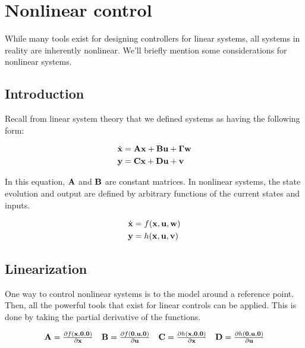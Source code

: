 
\chapter{Nonlinear control} \label{ch:nonlinear-control}

While many tools exist for designing controllers for linear systems, all systems
in reality are inherently nonlinear. We'll briefly mention some considerations
for nonlinear systems.

\section{Introduction}

Recall from linear system theory that we defined systems as having the following
form:

\begin{align*}
  \dot{\mathbf{x}} &= \mathbf{A}\mathbf{x} + \mathbf{B}\mathbf{u} + \mathbf{\Gamma}\mathbf{w} \\
  \mathbf{y} &= \mathbf{C}\mathbf{x} + \mathbf{D}\mathbf{u} + \mathbf{v}
\end{align*}

In this equation, $\mathbf{A}$ and $\mathbf{B}$ are constant matrices. In nonlinear
systems, the state evolution and output are defined by arbitrary functions of
the current states and inputs.

\begin{align*}
  \dot{\mathbf{x}} &= f(\mathbf{x}, \mathbf{u}, \mathbf{w}) \\
  \mathbf{y} &= h(\mathbf{x}, \mathbf{u}, \mathbf{v})
\end{align*}

\section{Linearization}

One way to control nonlinear systems is to 
the model around a reference point. Then, all the powerful tools that exist for
linear controls can be applied. This is done by taking the partial derivative of
the functions.

\begin{align*}
  \begin{array}{cccc}
    \mathbf{A} = \frac{\partial f(\mathbf{x}, \mathbf{0}, \mathbf{0})}{\partial \mathbf{x}} &
    \mathbf{B} = \frac{\partial f(\mathbf{0}, \mathbf{u}, \mathbf{0})}{\partial \mathbf{u}} &
    \mathbf{C} = \frac{\partial h(\mathbf{x}, \mathbf{0}, \mathbf{0})}{\partial \mathbf{x}} &
    \mathbf{D} = \frac{\partial h(\mathbf{0}, \mathbf{u}, \mathbf{0})}{\partial \mathbf{u}}
  \end{array}
\end{align*}

